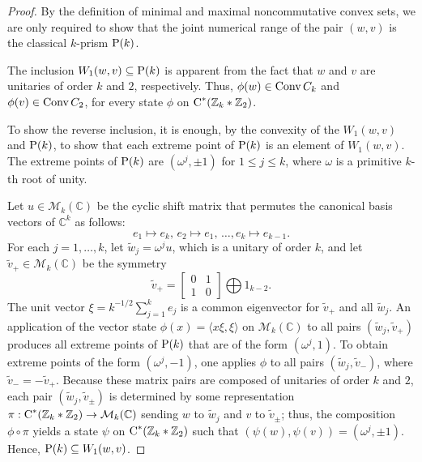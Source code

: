 \documentclass{amsart}
\theoremstyle{definition}
\theoremstyle{remark}
\newcommand{\M}{\mathcal{M}}
\newcommand\cstar{{\textrm C}^*}                              %
\numberwithin{equation}{section}
\begin{document}
\begin{proof} By the definition of minimal and maximal noncommutative convex sets,
we are only required to show that the joint numerical range of the pair $(w,v)$ is the classical $k$-prism
$\mbox{\textrm P}(k)$.

The inclusion $W_1(w,v)\subseteq \mbox{\textrm P}(k)$ is apparent from the fact that $w$ and $v$ are unitaries of order $k$ and $2$, respectively. Thus, 
$\phi(w)\in\mbox{\textrm Conv}\,C_k$ and $\phi(v)\in \mbox{\textrm Conv}\,C_2$, for every state $\phi$ on $\cstar(\mathbb Z_k * \mathbb Z_2)$.

To show the reverse inclusion, 
it is enough, by the convexity of the $W_1(w,v)$ and $\mbox{\textrm P}(k)$, to show that each extreme point of $\mbox{\textrm P}(k)$
is an element of $W_1(w,v)$. The extreme points of $\mbox{\textrm P}(k)$ are 
$(\omega^j, \pm 1)$ for $1\leq j\leq k$, where $\omega$ is a primitive $k$-th root of unity.

Let $u\in\M_k(\mathbb C)$ be the cyclic shift matrix that permutes the canonical basis vectors of $\mathbb C^k$ as follows:
\[
e_1\mapsto e_k, \, e_2\mapsto e_1,\, \dots, e_k\mapsto e_{k-1}.
\]
For each $j=1,\dots,k$, let $\tilde w_j=\omega^j u$, which is a unitary of order $k$, and let $\tilde v_+\in \M_k(\mathbb C)$ be the symmetry
\[
\tilde v_+= \left[\begin{array}{cc} 0&1 \\ 1&0 \end{array}\right] \bigoplus 1_{k-2}.
\]
The unit vector $\xi=k^{-1/2}\displaystyle\sum_{j=1}^ke_j$ is a common eigenvector for $\tilde v_+$ and all $\tilde w_j$. An application of the
vector state $\phi(x)=\langle x\xi,\xi\rangle$ on $\M_k(\mathbb C)$ to all pairs $(\tilde w_j, \tilde v_+)$ produces all extreme points of $\mbox{\textrm P}(k)$
that are of the form $(\omega^j,1)$. To obtain extreme points of the form $(\omega^j,-1)$, one applies $\phi$ to all pairs $(\tilde w_j, \tilde v_-)$,
where $ \tilde v_-=- \tilde v_+$. Because these matrix pairs are composed of unitaries of order $k$ and $2$, each pair 
$(\tilde{w}_j,\tilde{v}_{\pm})$ is determined by 
some representation $\pi:\cstar(\mathbb Z_k*\mathbb Z_2)\rightarrow\M_k(\mathbb C)$ sending $w$ to $\tilde w_j$ and $v$ to
$\tilde{v}_{\pm}$; thus, the composition $\phi\circ\pi$ yields a state $\psi$ on $\cstar(\mathbb Z_k*\mathbb Z_2)$ such that
$\left(\psi(w),\psi(v)\right)=(\omega^j,\pm 1)$. Hence, $\mbox{\textrm P}(k)\subseteq W_1(w,v)$.
\end{proof}
\end{document}
